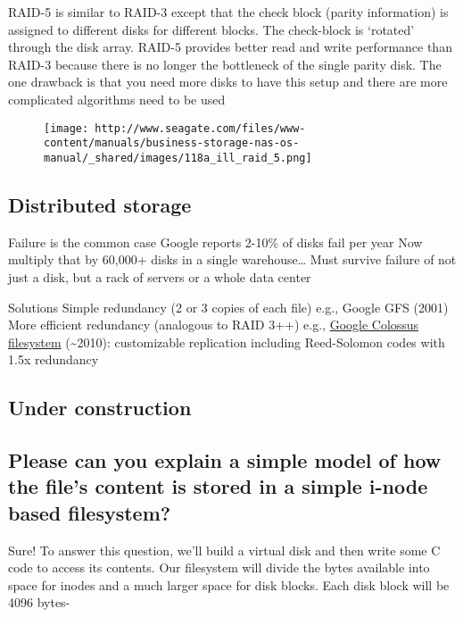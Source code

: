 RAID-5 is similar to RAID-3 except that the check block (parity information) is assigned to different disks for different blocks. The check-block is `rotated' through the disk array. RAID-5 provides better read and write performance than RAID-3 because there is no longer the bottleneck of the single parity disk. The one drawback is that you need more disks to have this setup and there are more complicated algorithms need to be used

\begin{figure}[htbp]
\centering
\texttt{[image: http://www.seagate.com/files/www-content/manuals/business-storage-nas-os-manual/\_shared/images/118a\_ill\_raid\_5.png]}
\caption{}
\end{figure}

\subsection{Distributed storage}\label{distributed-storage}

Failure is the common case Google reports 2-10\% of disks fail per year Now multiply that by 60,000+ disks in a single warehouse\ldots{} Must survive failure of not just a disk, but a rack of servers or a whole data center

Solutions Simple redundancy (2 or 3 copies of each file) e.g., Google GFS (2001) More efficient redundancy (analogous to RAID 3++) e.g., \href{http://goo.gl/LwFIy}{Google Colossus filesystem} (\textasciitilde{}2010): customizable replication including Reed-Solomon codes with 1.5x redundancy

\subsection{Under construction}\label{under-construction}

\subsection{Please can you explain a simple model of how the file's content is stored in a simple i-node based filesystem?}\label{please-can-you-explain-a-simple-model-of-how-the-files-content-is-stored-in-a-simple-i-node-based-filesystem}

Sure! To answer this question, we'll build a virtual disk and then write some C code to access its contents. Our filesystem will divide the bytes available into space for inodes and a much larger space for disk blocks. Each disk block will be 4096 bytes-

